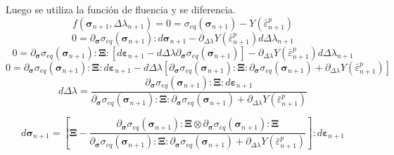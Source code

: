 \documentclass[12pt]{article}
\begin{document}
Luego se utiliza la función de fluencia y se diferencia.
\[ f(\pmb{\sigma}_{n+1}, \Delta\lambda_{n+1}) = 0 = \sigma_{eq}\left(\pmb{\sigma}_{n+1}\right) - Y\left(\bar\varepsilon^p_{n+1}\right)\]
\[ 0 = \partial_{\pmb{\sigma}}\sigma_{eq}\left(\pmb{\sigma}_{n+1}\right):d\pmb{\sigma}_{n+1} - \partial_{\Delta\lambda} Y\left(\bar\varepsilon^p_{n+1}\right) d\Delta\lambda_{n+1}\]
\[ 0 = \partial_{\pmb{\sigma}}\sigma_{eq}\left(\pmb{\sigma}_{n+1}\right):\pmb{\Xi}:\left[d\pmb{\varepsilon}_{n+1} - d\Delta\lambda\partial_{\pmb{\sigma}}\sigma_{eq}\left(\pmb{\sigma}_{n+1}\right)\right] - \partial_{\Delta\lambda} Y\left(\bar\varepsilon^p_{n+1}\right) d\Delta\lambda_{n+1}\]
\[ 0 = \partial_{\pmb{\sigma}}\sigma_{eq}\left(\pmb{\sigma}_{n+1}\right):\pmb{\Xi}:d\pmb{\varepsilon}_{n+1} - d\Delta\lambda\left[\partial_{\pmb{\sigma}}\sigma_{eq}\left(\pmb{\sigma}_{n+1}\right):\pmb{\Xi}:\partial_{\pmb{\sigma}}\sigma_{eq}\left(\pmb{\sigma}_{n+1}\right) + \partial_{\Delta\lambda} Y\left(\bar\varepsilon^p_{n+1}\right)\right]\]
\[ d\Delta\lambda = \frac{\partial_{\pmb{\sigma}}\sigma_{eq}\left(\pmb{\sigma}_{n+1}\right):\pmb{\Xi}:d\pmb{\varepsilon}_{n+1} }{\partial_{\pmb{\sigma}}\sigma_{eq}\left(\pmb{\sigma}_{n+1}\right):\pmb{\Xi}:\partial_{\pmb{\sigma}}\sigma_{eq}\left(\pmb{\sigma}_{n+1}\right) + \partial_{\Delta\lambda} Y\left(\bar\varepsilon^p_{n+1}\right)}\]

\[d\pmb{\sigma}_{n+1} = \left[\pmb{\Xi} - \frac{\partial_{\pmb{\sigma}}\sigma_{eq}\left(\pmb{\sigma}_{n+1}\right):\pmb{\Xi} \otimes \partial_{\pmb{\sigma}}\sigma_{eq}\left(\pmb{\sigma}_{n+1}\right):\pmb{\Xi} }{\partial_{\pmb{\sigma}}\sigma_{eq}\left(\pmb{\sigma}_{n+1}\right):\pmb{\Xi}:\partial_{\pmb{\sigma}}\sigma_{eq}\left(\pmb{\sigma}_{n+1}\right) + \partial_{\Delta\lambda} Y\left(\bar\varepsilon^p_{n+1}\right)}\right] :d\pmb{\varepsilon}_{n+1} \]

\end{document}
